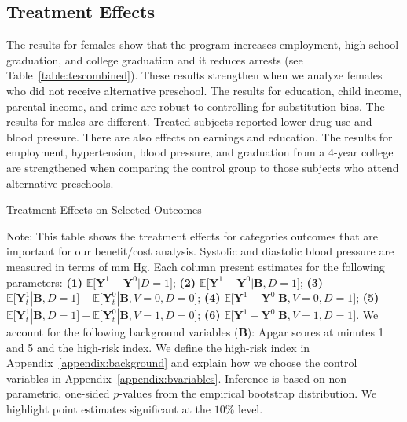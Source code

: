 \subsection{Treatment Effects}

The results for females show that the program increases employment, high school graduation, and college graduation and it reduces arrests (see Table~\ref{table:tescombined}). These results strengthen when we analyze females who did not receive alternative preschool. The results for education, child income, parental income, and crime are robust to controlling for substitution bias. The results for males are different. Treated subjects reported lower drug use and blood pressure. There are also effects on earnings and education. The results for employment, hypertension, blood pressure, and graduation from a 4-year college are strengthened when comparing the control group to those subjects who attend alternative preschools.

\begin{table}[!htbp]
\centering
\begin{threeparttable}
\caption{Treatment Effects on Selected Outcomes}\label{table:tescombined}
\begin{scriptsize}

\end{scriptsize}
\begin{tablenotes}
\tiny
Note: This table shows the treatment effects for categories outcomes that are important for our benefit/cost analysis. Systolic and diastolic blood pressure are measured in terms of mm Hg. Each column present estimates for the following parameters: \textbf{(1)} $\mathbb{E} \big[ \bm{Y}^1 - \bm{Y}^0 | D = 1]$; {\textbf{(2)} $\mathbb{E} \big[ \bm{Y}^1 - \bm{Y}^0 | \bm{B}, D=1 \big]$}; {\textbf{(3)} $\mathbb{E} \big[ \bm{Y}^1_t | \bm{B}, D=1 \big] - \mathbb{E} \big[ \bm{Y}^0_t | \bm{B}, V=0, D=0 \big]$}; {\textbf{(4)} $\mathbb{E} \big[ \bm{Y}^1 - \bm{Y}^0 | \bm{B}, V=0, D = 1 \big] $}; {\textbf{(5)} $\mathbb{E} \big[ \bm{Y}^1_t | \bm{B}, D=1 \big] - \mathbb{E} \big[ \bm{Y}^0_t | \bm{B}, V=1, D = 0 \big]$}; {\textbf{(6)} $\mathbb{E} \big[ \bm{Y}^1 - \bm{Y}^0 | \bm{B}, V=1 , D = 1\big]$}. We account for the following background variables ($\bm{B}$): Apgar scores at minutes 1 and 5 and the high-risk index. We define the high-risk index in Appendix~\ref{appendix:background} and explain how we choose the control variables in Appendix~\ref{appendix:bvariables}. Inference is based on non-parametric, one-sided $p$-values from the empirical bootstrap distribution. We highlight point estimates significant at the $10\%$ level.
\end{tablenotes}
\end{threeparttable}
\end{table}
\restoregeometry
\doublespacing


